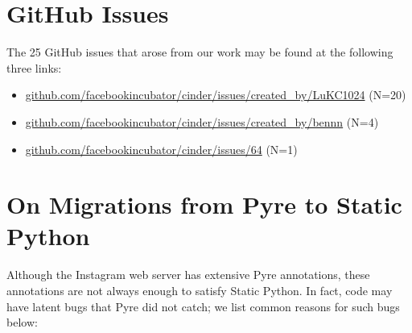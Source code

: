 \documentclass[english,cleveref,submission]{programming}
\newcommand{\shorturl}[2]{\href{#1#2}{#2}}
\newcommand{\SP}{Static Python}
\begin{document}

{\sloppy
\printbibliography
}

\appendix

\section{GitHub Issues}
\label{a:github-issues}

The 25 GitHub issues that arose from our work may be found at the following three links:

\begin{itemize}
  \item \shorturl{https://}{github.com/facebookincubator/cinder/issues/created\_by/LuKC1024} (N=20)
  \item \shorturl{https://}{github.com/facebookincubator/cinder/issues/created\_by/bennn} (N=4)
  \item \shorturl{https://}{github.com/facebookincubator/cinder/issues/64} (N=1)
\end{itemize}


\section{On Migrations from Pyre to \SP{}}

Although the Instagram web server has extensive Pyre annotations,
these annotations are not always enough to satisfy \SP{}.
In fact, code may have latent bugs that Pyre did not catch;
we list common reasons for such bugs below:
\end{document}
